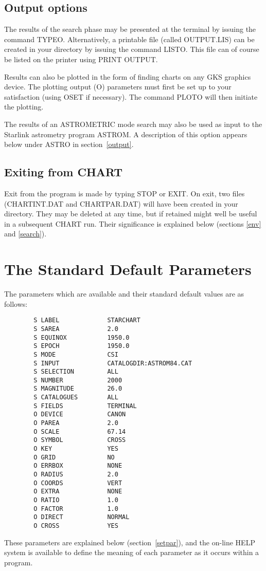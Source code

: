 \documentclass{article}
\begin{document}
\subsection{Output options}
The results of the search phase may be presented at the terminal by issuing the
command TYPEO.
Alternatively, a printable file (called OUTPUT.LIS) can be created in your
directory by issuing the command LISTO.
This file can of course be listed on the printer using PRINT OUTPUT.

Results can also be plotted in the form of finding charts on any GKS graphics
device.
The plotting output (O) parameters must first be set up to your satisfaction
(using OSET if necessary).
The command PLOTO will then initiate the plotting.

The results of an ASTROMETRIC mode search may also be used as input to the
Starlink astrometry program ASTROM.
A description of this option appears below under ASTRO in section~\ref{output}.
\subsection{Exiting from CHART}
Exit from the program is made by typing STOP or EXIT.
On exit, two files (CHARTINT.DAT and CHARTPAR.DAT) will have been created in
your directory.
They may be deleted at any time, but if retained might well be useful in a
subsequent CHART run.
Their significance is explained below (sections \ref{env} and \ref{search}).
\section{The Standard Default Parameters}
\label{defpar}
The parameters which are available and their standard default values are as
follows:
\begin{verbatim}
        S LABEL             STARCHART
        S SAREA             2.0
        S EQUINOX           1950.0
        S EPOCH             1950.0
        S MODE              CSI
        S INPUT             CATALOGDIR:ASTROM84.CAT
        S SELECTION         ALL
        S NUMBER            2000
        S MAGNITUDE         26.0
        S CATALOGUES        ALL
        S FIELDS            TERMINAL
        O DEVICE            CANON
        O PAREA             2.0
        O SCALE             67.14
        O SYMBOL            CROSS
        O KEY               YES
        O GRID              NO
        O ERRBOX            NONE
        O RADIUS            2.0
        O COORDS            VERT
        O EXTRA             NONE
        O RATIO             1.0
        O FACTOR            1.0
        O DIRECT            NORMAL
        O CROSS             YES

\end{verbatim}
These parameters are explained below (section~\ref{setpar}), and the on-line 
HELP system is available to define the meaning of each parameter as it occurs
within a program. 
\end{document}
